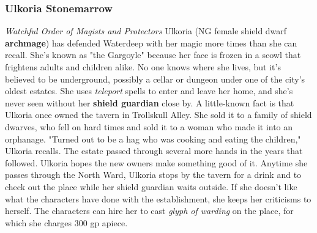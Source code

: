 \documentclass[10pt,a4paper,twoside,twocolumn,openany,nodeprecatedcode]{dndbook}
\begin{document}
\subsubsection{Ulkoria Stonemarrow}
\textit{Watchful Order of Magists and Protectors}
Ulkoria (NG female shield dwarf \textbf{archmage}) has defended Waterdeep with her magic more times than she can recall. She's known as "the Gargoyle" because her face is frozen in a scowl that frightens adults and children alike. No one knows where she lives, but it's believed to be underground, possibly a cellar or dungeon under one of the city's oldest estates. She uses \textit{teleport} spells to enter and leave her home, and she's never seen without her \textbf{shield guardian} close by.
A little-known fact is that Ulkoria once owned the tavern in Trollskull Alley. She sold it to a family of shield dwarves, who fell on hard times and sold it to a woman who made it into an orphanage. "Turned out to be a hag who was cooking and eating the children," Ulkoria recalls. The estate passed through several more hands in the years that followed. Ulkoria hopes the new owners make something good of it.
Anytime she passes through the North Ward, Ulkoria stops by the tavern for a drink and to check out the place while her shield guardian waits outside. If she doesn't like what the characters have done with the establishment, she keeps her criticisms to herself. The characters can hire her to cast \textit{glyph of warding} on the place, for which she charges 300 gp apiece.
\end{document}
